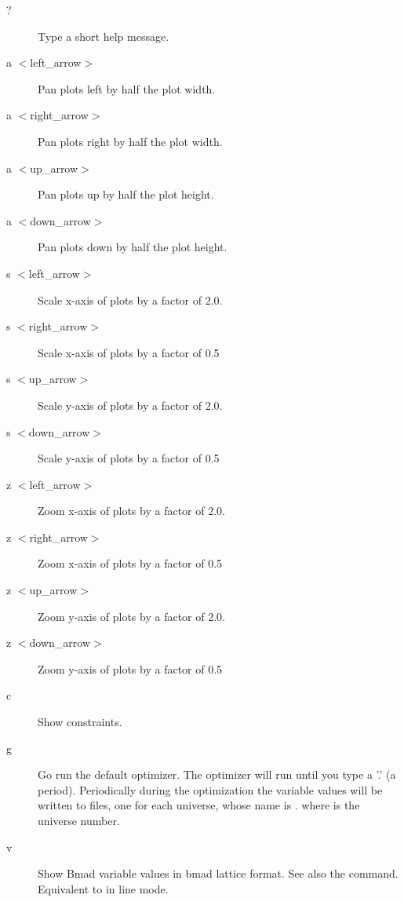 {\begin{description}
\item[?]
Type a short help message.

\item[a $<$left\_arrow$>$]
Pan plots left by half the plot width.

\item[a $<$right\_arrow$>$]
Pan plots right by half the plot width.

\item[a $<$up\_arrow$>$]
Pan plots up by half the plot height.

\item[a $<$down\_arrow$>$]
Pan plots down by half the plot height.

\item[s $<$left\_arrow$>$]
Scale x-axis of plots by a factor of 2.0.

\item[s $<$right\_arrow$>$]
Scale x-axis of plots by a factor of 0.5

\item[s $<$up\_arrow$>$]
Scale y-axis of plots by a factor of 2.0.

\item[s $<$down\_arrow$>$]
Scale y-axis of plots by a factor of 0.5


\item[z $<$left\_arrow$>$]
Zoom x-axis of plots by a factor of 2.0.

\item[z $<$right\_arrow$>$]
Zoom x-axis of plots by a factor of 0.5

\item[z $<$up\_arrow$>$]
Zoom y-axis of plots by a factor of 2.0.

\item[z $<$down\_arrow$>$]
Zoom y-axis of plots by a factor of 0.5

\item[c]  
Show constraints.

\item[g]
Go run the default optimizer. The optimizer will run until you type a
'.' (a period).  Periodically during the optimization the variable
values will be written to files, one for each universe, whose name is
. where \vn{\#} is the universe number.

\item[v]
Show Bmad variable values in bmad lattice format. See also the
 command. Equivalent to  in line mode.


\end{description}}
